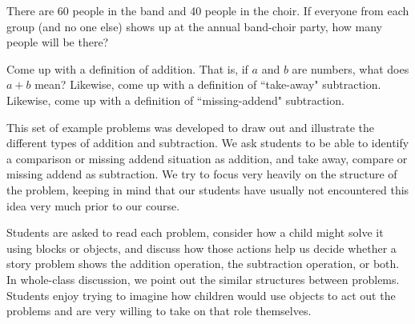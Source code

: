 \documentclass[nooutcomes]{ximera}
\begin{document}
\begin{problem}
There are 60 people in the band and 40 people in the choir.  If everyone from each group (and no one else) shows up at the annual band-choir party, how many people will be there?
\end{problem}

\begin{problem} \label{AddingUpSummary}
 Come up with a definition of addition.  That is, if $a$ and $b$ are numbers, what does $a + b$ mean?  Likewise, come up with a definition of ``take-away" subtraction.  Likewise, come up with a definition of ``missing-addend" subtraction.  
\end{problem}


\newpage
\begin{instructorNotes}
This set of example problems was developed to draw out and illustrate the different types of addition and subtraction.  We ask students to be able to identify a comparison or missing addend situation as addition, and take away, compare or missing addend as subtraction.  We try to focus very heavily on the structure of the problem, keeping in mind that our students have usually not encountered this idea very much prior to our course.

Students are asked to read each problem, consider how a child might solve it using blocks or objects, and discuss how those actions help us decide whether a story problem shows the addition operation, the subtraction operation, or both.  In whole-class discussion, we point out the similar structures between problems. Students enjoy trying to imagine how children would use objects to act out the problems and are very willing to take on that role themselves.



\end{instructorNotes}
\end{document}
